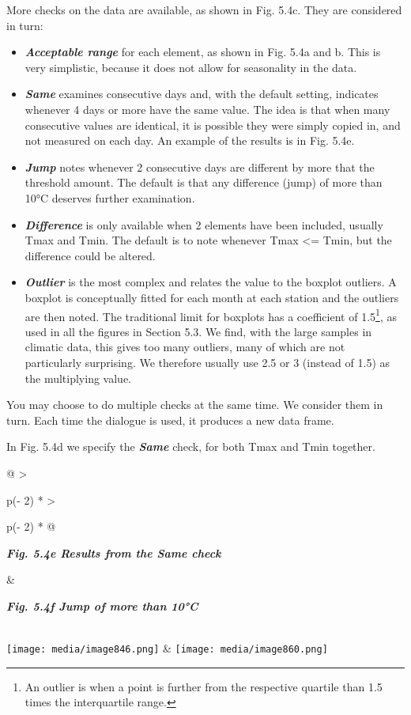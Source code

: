 \documentclass[
  letterpaper,
  DIV=11,
  numbers=noendperiod]{scrreprt}
\begin{document}
More checks on the data are available, as shown in Fig. 5.4c. They are
considered in turn:

\begin{itemize}
\item
  \textbf{\emph{Acceptable range}} for each element, as shown in Fig.
  5.4a and b. This is very simplistic, because it does not allow for
  seasonality in the data.
\item
  \textbf{\emph{Same}} examines consecutive days and, with the default
  setting, indicates whenever 4 days or more have the same value. The
  idea is that when many consecutive values are identical, it is
  possible they were simply copied in, and not measured on each day. An
  example of the results is in Fig. 5.4e.
\item
  \textbf{\emph{Jump}} notes whenever 2 consecutive days are different
  by more that the threshold amount. The default is that any difference
  (jump) of more than 10°C deserves further examination.
\item
  \textbf{\emph{Difference}} is only available when 2 elements have been
  included, usually Tmax and Tmin. The default is to note whenever Tmax
  \textless= Tmin, but the difference could be altered.
\item
  \textbf{\emph{Outlier}} is the most complex and relates the value to
  the boxplot outliers. A boxplot is conceptually fitted for each month
  at each station and the outliers are then noted. The traditional limit
  for boxplots has a coefficient of 1.5\footnote{An outlier is when a
    point is further from the respective quartile than 1.5 times the
    interquartile range.}, as used in all the figures in Section 5.3. We
  find, with the large samples in climatic data, this gives too many
  outliers, many of which are not particularly surprising. We therefore
  usually use 2.5 or 3 (instead of 1.5) as the multiplying value.
\end{itemize}

You may choose to do multiple checks at the same time. We consider them
in turn. Each time the dialogue is used, it produces a new data frame.

In Fig. 5.4d we specify the \textbf{\emph{Same}} check, for both Tmax
and Tmin together.

\begin{longtable}[]{@{}
  >{\raggedright\arraybackslash}p{(\columnwidth - 2\tabcolsep) * }
  >{\raggedright\arraybackslash}p{(\columnwidth - 2\tabcolsep) * }@{}}
\toprule\noalign{}
\begin{minipage}[b]{\linewidth}\raggedright
\textbf{\emph{Fig. 5.4e Results from the Same check}}
\end{minipage} & \begin{minipage}[b]{\linewidth}\raggedright
\textbf{\emph{Fig. 5.4f Jump of more than 10°C}}
\end{minipage} \\
\midrule\noalign{}
\endhead
\bottomrule\noalign{}
\endlastfoot
\texttt{[image: media/image846.png]} &
\texttt{[image: media/image860.png]} \\
\end{longtable}
\end{document}
